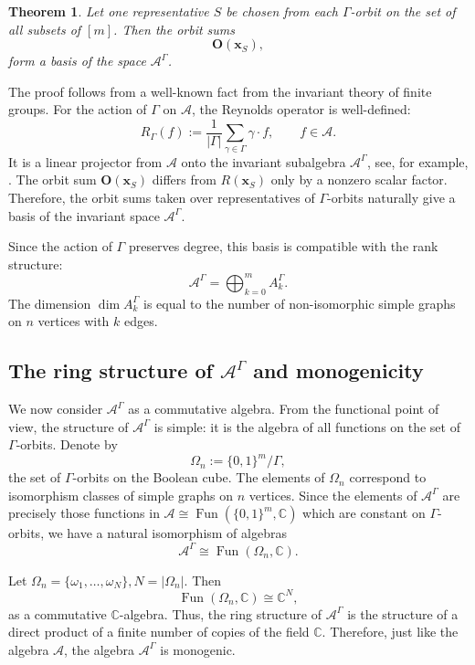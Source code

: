 \documentclass[12pt,reqno]{amsart}
\newtheorem{theorem}{Theorem}[section]
\begin{document}
\begin{theorem}
Let one representative $S$ be chosen from each $\Gamma$-orbit on the set of
all subsets of $[m]$. Then the orbit sums
$$
\mathbf O(\boldsymbol{x}_S),
$$
form a basis of the space $\mathcal A^\Gamma$.
\end{theorem}

The proof follows from a well-known fact from the invariant theory of finite
groups. For the action of $\Gamma$ on $\mathcal A$, the Reynolds operator is
well-defined:
$$
R_\Gamma(f):=\frac{1}{|\Gamma|}\sum_{\gamma\in\Gamma}\gamma\cdot f,
\qquad f\in\mathcal A.
$$
It is a linear projector from $\mathcal A$ onto the invariant subalgebra
$\mathcal A^\Gamma$,
see, for example, \cite{DK,Sturmfels}. The orbit sum
$\mathbf O(\boldsymbol{x}_S)$ differs from $R(\boldsymbol{x}_S)$ only by a
nonzero scalar factor. Therefore, the orbit sums taken over representatives
of $\Gamma$-orbits naturally give a basis of the invariant space
$\mathcal A^\Gamma$.

Since the action of $\Gamma$ preserves degree, this basis is compatible with
the rank structure:
$$
\mathcal A^\Gamma=\bigoplus_{k=0}^m A_k^\Gamma.
$$
The dimension $\dim A_k^\Gamma$ is equal to the number of non-isomorphic
simple graphs on $n$ vertices with $k$ edges.

\subsection{The ring structure of $\mathcal A^\Gamma$ and monogenicity}

We now consider $\mathcal A^\Gamma$ as a commutative algebra. From the
functional point of view, the structure of $\mathcal A^\Gamma$ is simple:
it is the algebra of all functions on the set of $\Gamma$-orbits.
Denote by
$$
\Omega_n:=\{0,1\}^m/\Gamma,
$$
the set of $\Gamma$-orbits on the Boolean cube. The elements of $\Omega_n$
correspond to isomorphism classes of simple graphs on $n$ vertices. Since the
elements of $\mathcal A^\Gamma$ are precisely those functions in
$\mathcal A\cong \operatorname{Fun}(\{0,1\}^m,\mathbb C)$ which are constant
on $\Gamma$-orbits, we have a natural isomorphism of algebras
\begin{equation}
\mathcal A^\Gamma\cong \operatorname{Fun}(\Omega_n,\mathbb C).
\end{equation}

Let
$
\Omega_n=\{\omega_1,\dots,\omega_N\},
N=|\Omega_n|.
$
Then
$$
\operatorname{Fun}(\Omega_n,\mathbb C)\cong \mathbb C^N,
$$
as a commutative $\mathbb C$-algebra.
Thus, the ring structure of $\mathcal A^\Gamma$ is the structure of a direct
product of a finite number of copies of the field $\mathbb C$.
Therefore, just like the algebra $\mathcal A$, the algebra
$\mathcal A^\Gamma$ is monogenic.
\end{document}
